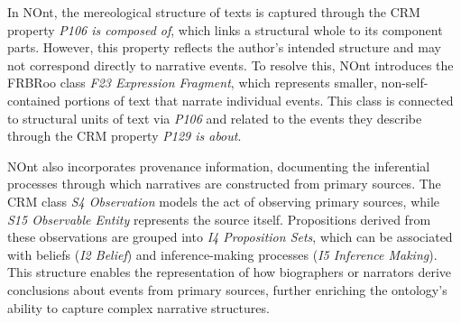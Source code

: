 In NOnt, the mereological structure of texts is captured through the CRM property \textit{P106 is composed of}, which links a structural whole to its component parts. However, this property reflects the author's intended structure and may not correspond directly to narrative events. To resolve this, NOnt introduces the FRBRoo class \textit{F23 Expression Fragment}, which represents smaller, non-self-contained portions of text that narrate individual events. This class is connected to structural units of text via \textit{P106} and related to the events they describe through the CRM property \textit{P129 is about}.

NOnt also incorporates provenance information, documenting the inferential processes through which narratives are constructed from primary sources. The CRM class \textit{S4 Observation} models the act of observing primary sources, while \textit{S15 Observable Entity} represents the source itself. Propositions derived from these observations are grouped into \textit{I4 Proposition Sets}, which can be associated with beliefs (\textit{I2 Belief}) and inference-making processes (\textit{I5 Inference Making}). This structure enables the representation of how biographers or narrators derive conclusions about events from primary sources, further enriching the ontology's ability to capture complex narrative structures.








